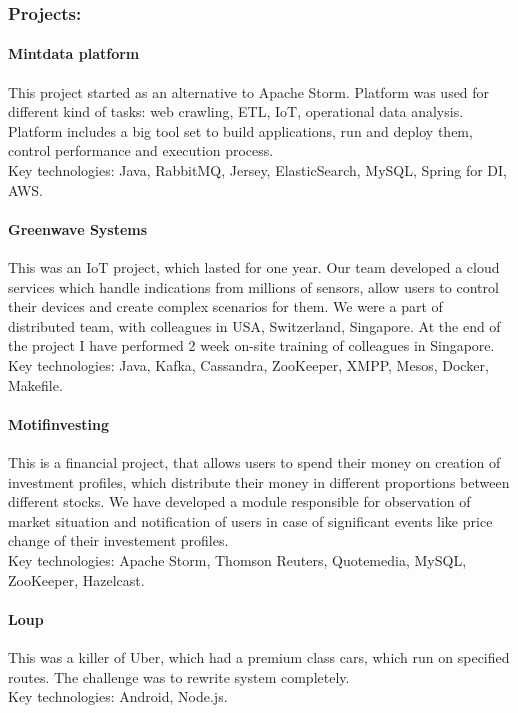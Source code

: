 \documentclass{article}
\begin{document}
\subsubsection*{Projects:}
\paragraph{Mintdata platform} This project started as an alternative to Apache Storm. Platform was used for different kind of tasks: web crawling, ETL, IoT, operational data analysis. Platform includes a big tool set to build applications, run and deploy them, control performance and execution process.\\
Key technologies: Java, RabbitMQ, Jersey, ElasticSearch, MySQL, Spring for DI, AWS.

\paragraph{Greenwave Systems} This was an IoT project, which lasted for one year. Our team developed a cloud services which handle indications from millions of sensors, allow users to control their devices and create complex scenarios for them. We were a part of distributed team, with colleagues in USA, Switzerland, Singapore. At the end of the project I have performed 2 week on-site training of colleagues in Singapore.\\
Key technologies: Java, Kafka, Cassandra, ZooKeeper, XMPP, Mesos, Docker, Makefile.

\paragraph{Motifinvesting} This is a financial project, that allows users to spend their money on creation of investment profiles, which distribute their money in different proportions between different stocks. We have developed a module responsible for observation of market situation and notification of users in case of significant events like price change of their investement profiles.\\
Key technologies: Apache Storm, Thomson Reuters, Quotemedia, MySQL, ZooKeeper, Hazelcast.

\paragraph{Loup} This was a killer of Uber, which had a premium class cars, which run on specified routes. The challenge was to rewrite system completely.\\
Key technologies: Android, Node.js.
\end{document}
